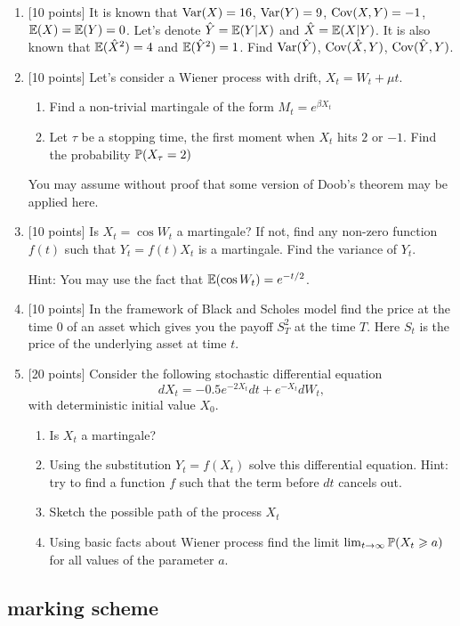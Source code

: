 \documentclass[pdftex,12pt,a4paper]{article}
\begin{document}
\begin{enumerate}
\item $[$10 points] It is known that $\Var(X)=16$, $\Var(Y)=9$, $\Cov(X,Y)=-1$, $\E(X)=\E(Y)=0$. Let's denote $\hat{Y}=\E(Y|X)$ and $\hat{X}=\E(X|Y)$. It is also known that $\E(\hat{X}^2)=4$ and $\E(\hat{Y}^2)=1$.  Find $\Var(\hat{Y})$, $\Cov(\hat{X},Y)$, $\Cov(\hat{Y},Y)$.
\item $[$10 points] Let's consider a Wiener process with drift, $X_t=W_t+\mu t$. 
\begin{enumerate}
\item Find a non-trivial martingale of the form $M_t=e^{\beta X_t}$
\item Let $\tau$ be a stopping time, the first moment when $X_t$ hits $2$ or $-1$. Find the probability $\P(X_\tau=2)$
\end{enumerate}
You may assume without proof that some version of Doob's theorem may be applied here.
\item $[$10 points] Is $X_t=\cos W_t$ a martingale? If not, find any non-zero function $f(t)$ such that $Y_t=f(t)X_t$ is a martingale. Find the variance of $Y_t$.

Hint: You may use the fact that $\E(\cos W_t)=e^{-t/2}$.

\item $[$10 points] In the framework of Black and Scholes model find the price at the time $0$ of an asset which gives you the payoff $S_T^2$ at the time $T$. Here $S_t$ is the price of the underlying asset at time $t$.
\item $[$20 points] Consider the following stochastic differential equation
\[
dX_t=-0.5e^{-2X_t}dt+e^{-X_t}dW_t,
\]
with deterministic initial value $X_0$.
\begin{enumerate}
\item Is $X_t$ a martingale?
\item Using the substitution $Y_t=f(X_t)$ solve this differential equation. Hint: try to find a function $f$ such that the term before $dt$ cancels out.
\item Sketch the possible path of the process $X_t$
\item Using basic facts about Wiener process find the limit $\lim_{t\to\infty} \P(X_t \geq a)$ for all values of the parameter $a$.
\end{enumerate}

\end{enumerate}

\subsection{marking scheme}
\end{document}
